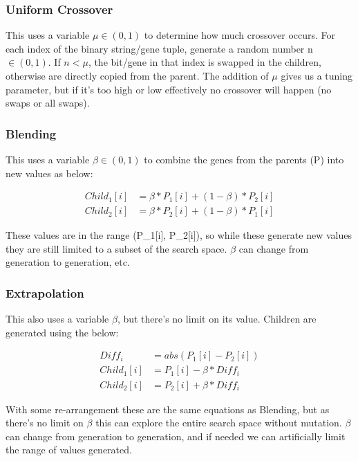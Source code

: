 \subsubsection{Uniform Crossover}
This uses a variable $\mu \in (0,1)$ to determine how much crossover occurs. For each index of the binary string/gene tuple, generate a random number n $\in (0,1)$. If $n < \mu$, the bit/gene in that index is swapped in the children, otherwise are directly copied from the parent. The addition of $\mu$ gives us a tuning parameter, but if it's too high or low effectively no crossover will happen (no swaps or all swaps).

\subsubsection{Blending}
This uses a variable $\beta \in (0,1)$ to combine the genes from the parents (P) into new values as below:

\begin{align}
    Child_1[i] &= \beta * P_1[i] + (1-\beta) * P_2[i] \nonumber\\
    Child_2[i] &= \beta * P_2[i] + (1-\beta) * P_1[i] \nonumber  
\end{align}

These values are in the range (P\_1[i], P\_2[i]), so while these generate new values they are still limited to a subset of the search space. $\beta$ can change from generation to generation, etc. 

\subsubsection{Extrapolation}
This also uses a variable $\beta$, but there's no limit on its value. Children are generated using the below:

\begin{align}
    Diff_i &= abs(P_1[i] - P_2[i]) \nonumber \\
    Child_1[i] &= P_1[i] - \beta * Diff_i \nonumber\\
    Child_2[i] &= P_2[i] + \beta * Diff_i \nonumber  
\end{align}

With some re-arrangement these are the same equations as Blending, but as there's no limit on $\beta$ this can explore the entire search space without mutation.  $\beta$ can change from generation to generation, and if needed we can artificially limit the range of values generated. 